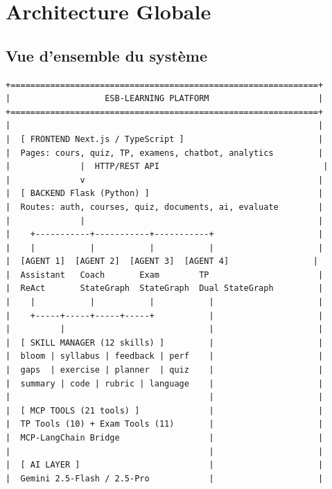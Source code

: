 \documentclass[12pt,a4paper]{article}
\begin{document}
\section{Architecture Globale}

\subsection{Vue d'ensemble du système}

\begin{lstlisting}[basicstyle=\ttfamily\scriptsize]
+==============================================================+
|                   ESB-LEARNING PLATFORM                      |
+==============================================================+
|                                                              |
|  [ FRONTEND Next.js / TypeScript ]                           |
|  Pages: cours, quiz, TP, examens, chatbot, analytics         |
|              |  HTTP/REST API                                 |
|              v                                               |
|  [ BACKEND Flask (Python) ]                                  |
|  Routes: auth, courses, quiz, documents, ai, evaluate        |
|              |                                               |
|    +-----------+-----------+-----------+                     |
|    |           |           |           |                     |
|  [AGENT 1]  [AGENT 2]  [AGENT 3]  [AGENT 4]                 |
|  Assistant   Coach       Exam        TP                      |
|  ReAct       StateGraph  StateGraph  Dual StateGraph         |
|    |           |           |           |                     |
|    +-----+-----+-----+-----+           |                     |
|          |                             |                     |
|  [ SKILL MANAGER (12 skills) ]         |                     |
|  bloom | syllabus | feedback | perf    |                     |
|  gaps  | exercise | planner  | quiz    |                     |
|  summary | code | rubric | language    |                     |
|                                        |                     |
|  [ MCP TOOLS (21 tools) ]              |                     |
|  TP Tools (10) + Exam Tools (11)       |                     |
|  MCP-LangChain Bridge                  |                     |
|                                        |                     |
|  [ AI LAYER ]                          |                     |
|  Gemini 2.5-Flash / 2.5-Pro            |                     |

\end{lstlisting}
\end{document}
